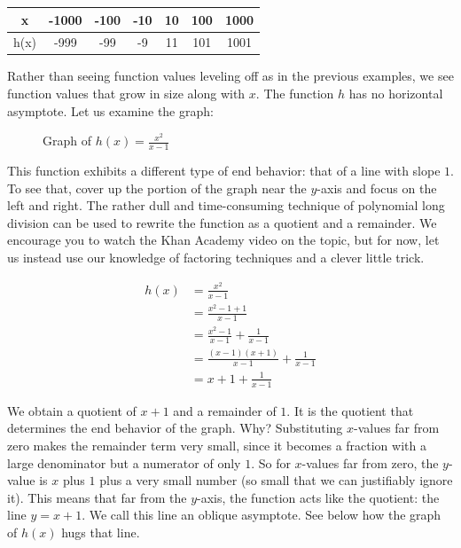 \begin{center}
\begin{tabular}{ |c|c|c|c|c|c|c| } 
 \hline
 x & -1000 & -100 & -10 & 10 & 100 & 1000 \\ 
 \hline
 h(x) & -999 & -99 & -9 & 11 & 101 & 1001 \\ 
 \hline
\end{tabular}
\end{center}

Rather than seeing function values leveling off as in the previous examples, we see function values that grow in size along with \( x \). The function \( h \) has no horizontal asymptote. Let us examine the graph:

\begin{figure}[H]
  \centering
  \caption{Graph of \( h(x) = \frac{x^2}{x - 1} \)}
\end{figure}

This function exhibits a different type of end behavior: that of a line with slope \( 1 \). To see that, cover up the portion of the graph near the \( y \)-axis and focus on the left and right. The rather dull and time-consuming technique of polynomial long division can be used to rewrite the function as a quotient and a remainder. We encourage you to watch the Khan Academy video on the topic, but for now, let us instead use our knowledge of factoring techniques and a clever little trick.

\begin{equation} \label{eq1_3}
\begin{split}
h(x) & = \frac{x^2}{x - 1} \\
& = \frac{x^2 - 1 + 1}{x - 1} \\ 
& = \frac{x^2 - 1}{x - 1} + \frac{1}{x - 1} \\
& = \frac{(x - 1)(x + 1)}{x - 1} + \frac{1}{x - 1} \\
& = x + 1 + \frac{1}{x - 1}
\end{split}
\end{equation}

We obtain a quotient of \( x + 1 \) and a remainder of \( 1 \). It is the quotient that determines the end behavior of the graph. Why? Substituting \( x \)-values far from zero makes the remainder term very small, since it becomes a fraction with a large denominator but a numerator of only \( 1 \). So for \( x \)-values far from zero, the \( y \)-value is \( x \) plus \( 1 \) plus a very small number (so small that we can justifiably ignore it). This means that far from the \( y \)-axis, the function acts like the quotient: the line \( y = x + 1 \). We call this line an oblique asymptote. See below how the graph of \( h(x) \) hugs that line.

